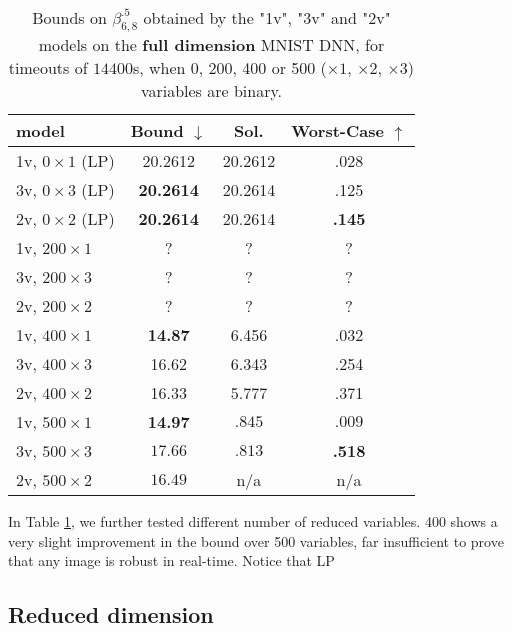 	
	\begin{table}[h!]
		\centering
	\begin{tabular}{||l||c|c|c||}\hline\hline
		model &        Bound $\downarrow$ &  Sol. &      Worst-Case $\uparrow$ \\\hline \hline
		1v, $0 \times 1$ (LP) & 20.2612  & 20.2612  & .028 \\\hline 
		3v, $0 \times 3$ (LP) & {\bf 20.2614}  & 20.2614  & .125 \\\hline 
	    2v, $0 \times 2$ (LP) & {\bf 20.2614}  & 20.2614  & {\bf .145} \\\hline\hline	 

		1v, $200 \times 1$ & ? & ? & ? \\\hline 
		3v, $200 \times 3$ & ? & ? & ? \\\hline 
	    2v, $200 \times 2$ & ? & ? & ? \\\hline\hline	 

		1v, $400 \times 1$ & {\bf 14.87} & 6.456 & .032 \\\hline 
		3v, $400 \times 3$ & 16.62 & 6.343 & .254 \\\hline 
	    2v, $400 \times 2$ & 16.33 & 5.777 & .371 \\\hline \hline

		1v, $500 \times 1$ & {\bf 14.97} & $.845$ & $.009$ \\\hline 
		3v, $500 \times 3$ & $17.66$ & $.813$ & {\bf .518} \\\hline 
	    2v, $500 \times 2$ & $16.49$ & n/a & n/a \\\hline\hline	 
	\end{tabular}
	\caption{Bounds on $\beta^{.5}_{6,8}$ 
	obtained by the "1v", "3v" and "2v" models 
	on the {\bf full dimension} MNIST DNN, 
	for timeouts of $14400$s, when 0, 200, 400 or 500 ($\times 1$, $\times 2$, $\times 3$) variables are binary.}
	\label{table.mnist}
\end{table}

In Table \ref{table.mnist}, we further tested different number of reduced variables. 400 shows a very slight improvement in the bound over 500 variables, 
far insufficient to prove that any image is robust in real-time. Notice that LP

\subsection{Reduced dimension}

